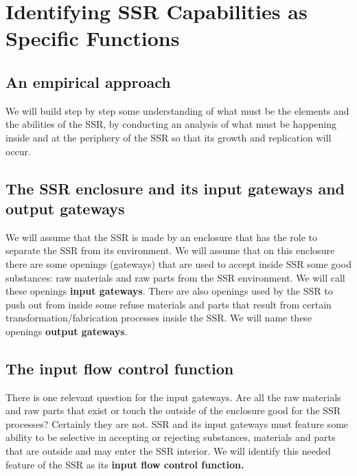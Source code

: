 \section{Identifying SSR Capabilities as Specific Functions}

\subsection[An empirical approach]{An empirical approach}

We will build step by step some
understanding of what must be the elements and the abilities of the
SSR, by conducting an analysis of what must be happening inside and at
the periphery of the SSR so that its growth and replication will occur.


\subsection[The SSR enclosure and its input gateways and output
gateways]{The SSR enclosure and its input gateways and output gateways}

\hypertarget{RefHeading3050306210128}{}We will assume that the SSR is
made by an enclosure that has the role to separate the SSR from its
environment. We will assume that on this enclosure there are some
openings (gateways) that are used to accept inside SSR some good
substances: raw materials and raw parts from the SSR environment. We
will call these openings \textbf{input gateways}. There are also
openings used by the SSR to push out from inside some refuse materials
and parts that result from certain transformation/fabrication processes
inside the SSR. We will name these openings \textbf{output gateways}.

\subsection[The input flow control function]{The input flow control
function}

\hypertarget{RefHeading3052306210128}{}There is one relevant question
for the input gateways. Are all the raw materials and raw parts that
exist or touch the outside of the enclosure good for the SSR processes?
Certainly they are not. SSR and its input gateways must feature some
ability to be selective in accepting or rejecting substances, materials
and parts that are outside and may enter the SSR interior. We will
identify this needed feature of the SSR as its \textbf{input flow
control function.}

